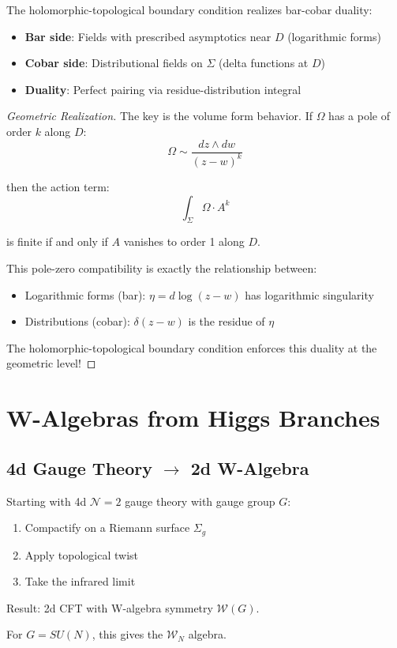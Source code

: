 \begin{theorem}
The holomorphic-topological boundary condition realizes bar-cobar duality:
\begin{itemize}
\item \textbf{Bar side}: Fields with prescribed asymptotics near $D$ (logarithmic 
forms)
\item \textbf{Cobar side}: Distributional fields on $\Sigma$ (delta functions at $D$)
\item \textbf{Duality}: Perfect pairing via residue-distribution integral
\end{itemize}
\end{theorem}

\begin{proof}[Geometric Realization]
The key is the volume form behavior. If $\Omega$ has a pole of order $k$ along 
$D$:
$$\Omega \sim \frac{dz \wedge dw}{(z-w)^k}$$

then the action term:
$$\int_{\Sigma} \Omega \cdot A^k$$

is finite if and only if $A$ vanishes to order 1 along $D$.

This pole-zero compatibility is exactly the relationship between:
\begin{itemize}
\item Logarithmic forms (bar): $\eta = d\log(z-w)$ has logarithmic singularity
\item Distributions (cobar): $\delta(z-w)$ is the residue of $\eta$
\end{itemize}

The holomorphic-topological boundary condition enforces this duality at the 
geometric level!
\end{proof}

\section{W-Algebras from Higgs Branches}

\subsection{4d Gauge Theory $\to$ 2d W-Algebra}

\begin{theorem}
Starting with 4d $\mathcal{N}=2$ gauge theory with gauge group $G$:
\begin{enumerate}
\item Compactify on a Riemann surface $\Sigma_g$
\item Apply topological twist
\item Take the infrared limit
\end{enumerate}

Result: 2d CFT with W-algebra symmetry $\mathcal{W}(G)$.

For $G = SU(N)$, this gives the $\mathcal{W}_N$ algebra.
\end{theorem}

